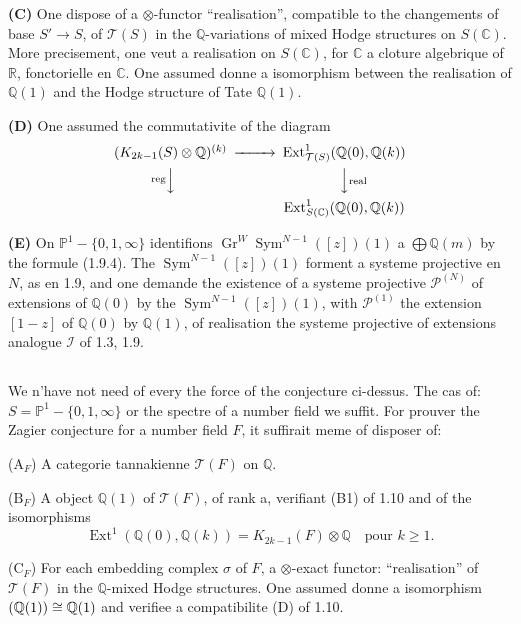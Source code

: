 \documentclass[12pt,a4paper]{article}
\theoremstyle{plain}
\theoremstyle{definition}
\theoremstyle{remark}
\DeclareMathOperator{\Ext}{Ext}
\DeclareMathOperator{\Sym}{Sym}
\DeclareMathOperator{\reg}{reg}
\newcommand{\Q}{\mathbb{Q}}
\newcommand{\R}{\mathbb{R}}
\newcommand{\C}{\mathbb{C}}
\newcommand{\IP}{\mathbb{P}}
\begin{document}
{\textbf{(C)} One dispose of a $\otimes$-functor ``r{e}alisation'', compatible to the changements of base $S'\to S$, of $\mathcal{T}(S)$ in the $\Q$-variations of mixed Hodge structures on $S(\C)$. More pr{e}cisement, one veut a r{e}alisation on $S(\C)$, for $\C$ a cl{o}ture alg{e}brique of $\R$, fonctorielle en $\C$. One assumed donn{e} a isomorphism between the r{e}alisation of $\Q(1)$ and the Hodge structure of Tate $\Q(1)$.

\textbf{(D)} One assumed the commutativit{e} of the diagram
\begin{equation*}
\begin{CD}
(K_{2k-1}(S)\otimes\Q)^{(k)} @>>> \Ext^1_{\mathcal{T}(S)}(\Q(0),\Q(k)) \\
@V{\reg}VV @VV{\text{real}}V \\
@. \Ext^1_{S(\C)}(\Q(0),\Q(k))
\end{CD}
\end{equation*}

\textbf{(E)} On $\IP^1-\{0,1,\infty\}$ identifions $\operatorname{Gr}^W\Sym^{N-1}([z])(1)$ {a} $\bigoplus\Q(m)$ by the formule (1.9.4). The $\Sym^{N-1}([z])(1)$ forment a syst{e}me projective en $N$, as en 1.9, and one demande the existence of a syst{e}me projective $\mathcal{P}^{(N)}$ of extensions of $\Q(0)$ by the $\Sym^{N-1}([z])(1)$, with $\mathcal{P}^{(1)}$ the extension $[1-z]$ of $\Q(0)$ by $\Q(1)$, of r{e}alisation the syst{e}me projective of extensions analogue $\mathcal{I}$ of 1.3, 1.9.

\subsection{}

We n'have not need of every the force of the conjecture ci-dessus. The cas of: $S=\IP^1-\{0,1,\infty\}$ or the spectre of a number field we suffit. For prouver the Zagier conjecture for a number field $F$, it suffirait m{e}me of disposer of:

($\text{A}_F$) A cat{e}gorie tannakienne $\mathcal{T}(F)$ on $\Q$.

($\text{B}_F$) A object $\Q(1)$ of $\mathcal{T}(F)$, of rank a, v{e}rifiant (B1) of 1.10 and of the isomorphisms
\begin{equation*}
\Ext^1(\Q(0),\Q(k)) = K_{2k-1}(F)\otimes\Q \quad \text{pour }k\geq 1.
\end{equation*}

($\text{C}_F$) For each embedding complex $\sigma$ of $F$, a $\otimes$-exact functor: ``r{e}alisation'' of $\mathcal{T}(F)$ in the $\Q$-mixed Hodge structures. One assumed donn{e} a isomorphism $\real(\Q(1))\cong\Q(1)$ and v{e}rifi{e}e a compatibilit{e} (D) of 1.10.

}
\end{document}
